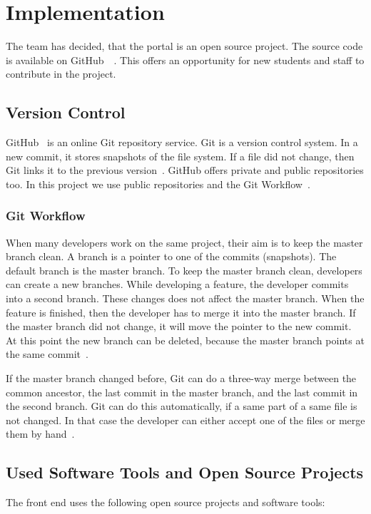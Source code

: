 \chapter{Implementation}\label{implementation}

The team has decided, that the portal is an open source project. The source code is available on GitHub~\cite{Github-student-frontend}~\cite{Github-backend}. This offers an opportunity for new students and staff to contribute in the project. 

\section{Version Control}
GitHub~\cite{github} is an online Git repository service. Git is a version control system. In a new commit, it stores snapshots of the file system. If a file did not change, then Git links it to the previous version~\cite{git}. GitHub offers private and public repositories too. In this project we use public repositories and the Git Workflow~\cite{git-workflow}. 

\subsection{Git Workflow}
When many developers work on the same project, their aim is to keep the master branch clean. A branch is a pointer to one of the commits (snapshots). The default branch is the master branch. To keep the master branch clean, developers can create a new branches. While developing a feature, the developer commits into a second branch. These changes does not affect the master branch. When the feature is finished, then the developer has to merge it into the master branch. If the master branch did not change, it will move the pointer to the new commit. At this point the new branch can be deleted, because the master branch points at the same commit~\cite{git-workflow2}.

If the master branch changed before, Git can do a three-way merge between the common ancestor, the last commit in the master branch, and the last commit in the second branch. Git can do this automatically, if a same part of a same file is not changed. In that case the developer can either accept one of the files or merge them by hand~\cite{git-workflow2}.

\section{Used Software Tools and Open Source Projects}
The front end uses the following open source projects and software tools:

